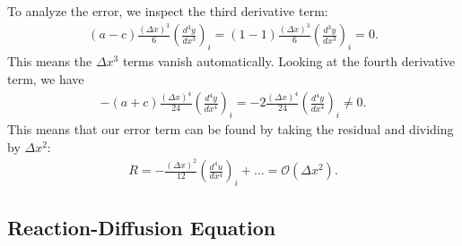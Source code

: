 To analyze the error, we inspect the third derivative term:
\begin{align}
  ( a - c ) \frac{(\Delta x)^3}{6} \left( \frac{d^3 y}{dx^3} \right)_i = ( 1 - 1 ) \frac{(\Delta x)^3}{6} \left( \frac{d^3 y}{dx^3} \right)_i = 0 . \nonumber
\end{align}
This means the $\Delta x^3$ terms vanish automatically. Looking at the fourth derivative term, we have
\begin{align}
  - ( a + c ) \frac{(\Delta x)^4}{24} \left( \frac{d^4 y}{dx^4} \right)_i = -2 \frac{(\Delta x)^4}{24} \left( \frac{d^4 y}{dx^4} \right)_i \ne 0 . \nonumber
\end{align}
This means that our error term can be found by taking the residual and dividing by $\Delta x^2$:
\begin{align}
  R = -\frac{(\Delta x)^2}{12} \left( \frac{d^4 u}{dx^4} \right)_i + \ldots = \mathcal{O}(\Delta x^2) .
\end{align}

\subsection{Reaction-Diffusion Equation} \label{Sec:ode_finiteDifference_reactionDiffusion}

